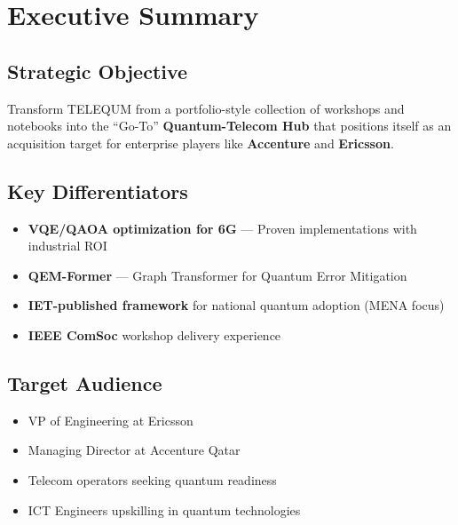 \documentclass[11pt,a4paper]{article}
\begin{document}
\tableofcontents
\newpage

\section{Executive Summary}

\subsection{Strategic Objective}
Transform TELEQUM from a portfolio-style collection of workshops and notebooks into the ``Go-To'' \textbf{Quantum-Telecom Hub} that positions itself as an acquisition target for enterprise players like \textbf{Accenture} and \textbf{Ericsson}.

\subsection{Key Differentiators}
\begin{itemize}
    \item \textbf{VQE/QAOA optimization for 6G} --- Proven implementations with industrial ROI
    \item \textbf{QEM-Former} --- Graph Transformer for Quantum Error Mitigation
    \item \textbf{IET-published framework} for national quantum adoption (MENA focus)
    \item \textbf{IEEE ComSoc} workshop delivery experience
\end{itemize}

\subsection{Target Audience}
\begin{itemize}
    \item VP of Engineering at Ericsson
    \item Managing Director at Accenture Qatar
    \item Telecom operators seeking quantum readiness
    \item ICT Engineers upskilling in quantum technologies
\end{itemize}

\end{document}
